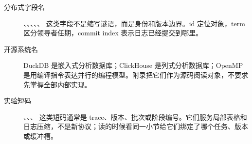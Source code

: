 \begin{description}
  \item[分布式字段名] 、、、、、 这类字段不是缩写谜语，而是身份和版本边界。id 定位对象，term 区分领导者任期，commit index 表示日志已经提交到哪里。
  \item[开源系统名] DuckDB 是嵌入式分析数据库；ClickHouse 是列式分析数据库；OpenMP 是用编译指令表达并行的编程模型。附录把它们作为源码阅读对象，不要求先掌握全部内部实现。
  \item[实验短码] 、、、 这类短码通常是 trace、版本、批次或阶段编号。它们服务局部表格和日志压缩，不是新协议；读的时候看同一小节给它们绑定了哪个任务、版本或缓冲槽。
\end{description}
